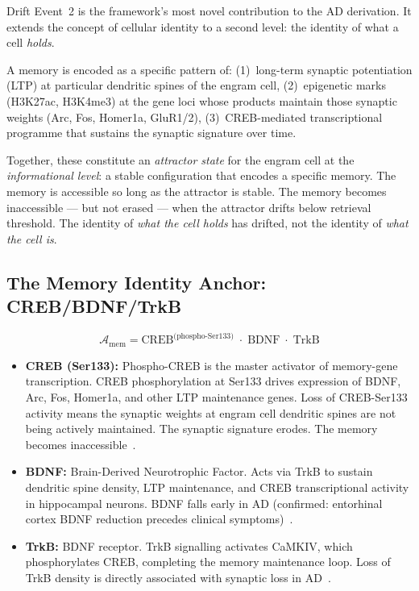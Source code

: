 \documentclass[12pt,a4paper]{article}
\newenvironment{memenv}[1]{%
  \begin{tcolorbox}[colback=teal!5,colframe=teal,boxrule=1pt,
    arc=3pt,title={\bfseries\color{white}#1},colbacktitle=teal,
    left=8pt,right=8pt,top=6pt,bottom=6pt,breakable]}{%
  \end{tcolorbox}}
\newcommand{\IA}{\mathcal{A}}
\begin{document}
Drift Event~2 is the framework's most novel contribution to
the AD derivation. It extends the concept of cellular identity
to a second level: the identity of what a cell \emph{holds}.

\begin{memenv}{What Memory Identity Means Geometrically}
A memory is encoded as a specific pattern of:
(1)~long-term synaptic potentiation (LTP) at particular
dendritic spines of the engram cell, (2)~epigenetic marks
(H3K27ac, H3K4me3) at the gene loci whose products
maintain those synaptic weights (Arc, Fos, Homer1a,
GluR1/2), (3)~CREB-mediated transcriptional programme
that sustains the synaptic signature over time.

\medskip
Together, these constitute an \emph{attractor state}
for the engram cell at the \emph{informational level}:
a stable configuration that encodes a specific memory.
The memory is accessible so long as the attractor is
stable. The memory becomes inaccessible --- but not
erased --- when the attractor drifts below retrieval
threshold. The identity of \emph{what the cell holds}
has drifted, not the identity of \emph{what the cell is}.
\end{memenv}

\subsection{The Memory Identity Anchor: CREB/BDNF/TrkB}

\begin{equation}
  \IA_{\mathrm{mem}} = \text{CREB}^{\text{(phospho-Ser133)}}
    \;\cdot\; \text{BDNF} \;\cdot\; \text{TrkB}
  \label{eq:anchor_mem}
\end{equation}

\begin{itemize}
  \item \textbf{CREB (Ser133):} Phospho-CREB is the
    master activator of memory-gene transcription.
    CREB phosphorylation at Ser133 drives expression
    of BDNF, Arc, Fos, Homer1a, and other LTP
    maintenance genes. Loss of CREB-Ser133 activity
    means the synaptic weights at engram cell dendritic
    spines are not being actively maintained. The
    synaptic signature erodes. The memory becomes
    inaccessible~\cite{Bhatt2009,Yiu2014}.
  \item \textbf{BDNF:} Brain-Derived Neurotrophic Factor.
    Acts via TrkB to sustain dendritic spine density,
    LTP maintenance, and CREB transcriptional activity
    in hippocampal neurons. BDNF falls early in AD
    (confirmed: entorhinal cortex BDNF reduction
    precedes clinical symptoms)~\cite{Holsinger2000}.
  \item \textbf{TrkB:} BDNF receptor. TrkB signalling
    activates CaMKIV, which phosphorylates CREB,
    completing the memory maintenance loop. Loss of
    TrkB density is directly associated with synaptic
    loss in AD~\cite{Allen2015}.
\end{itemize}
\end{document}
